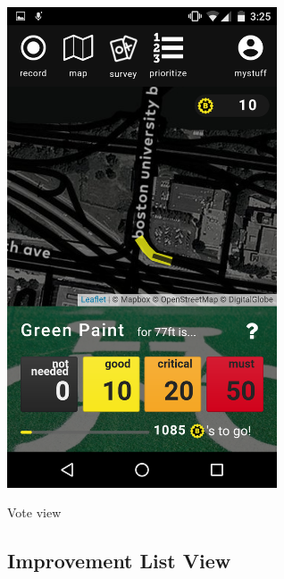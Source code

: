 \begin{marginfigure}
  \includegraphics[width=0.6\textwidth]{chapters/4/fig/interface_vote.png}               
  \caption[interface: Vote]{Vote view}
  \label{fig:interface_vote}
\end{marginfigure}

\subsection{Improvement List View}

